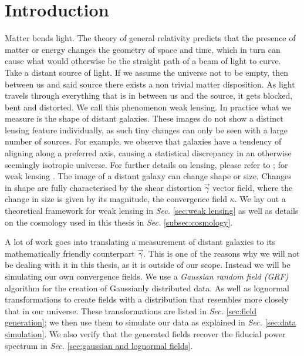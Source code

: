 \chapter{Introduction}

Matter bends light. The theory of general relativity predicts that the presence of matter or energy changes the geometry of space and time, which in turn can cause what would otherwise be the straight path of a beam of light to curve. Take a distant source of light. If we assume the universe not to be empty, then between us and said source there exists a non trivial matter disposition. As light travels through everything that is in between us and the source, it gets blocked, bent and distorted. We call this phenomenon weak lensing. In practice what we measure is the shape of distant galaxies. These images do not show a distinct lensing feature individually, as such tiny changes can only be seen with a large number of sources. For example, we observe that galaxies have a tendency of aligning along a preferred axis, causing a statistical discrepancy in an otherwise seemingly isotropic universe. For further details on lensing, please refer to \cite{cosmology:lensing} \cite{cosmology:lensing2}; for weak lensing \cite{weaklensing}. The image of a distant galaxy can change shape or size. Changes in shape are fully characterised by the shear distortion $\Vec{\gamma}$ vector field, where the change in size is given by its magnitude, the convergence field $\kappa$. We lay out a theoretical framework for weak lensing in \textit{Sec. }\ref{sec:weak lensing} as well as details on the cosmology used in this thesis in \textit{Sec. }\ref{subsec:cosmology}.

A lot of work goes into translating a measurement of distant galaxies to its mathematically friendly counterpart $\Vec{\gamma}$. This is one of the reasons why we will not be dealing with it in this thesis, as it is outside of our scope. Instead we will be simulating our own convergence fields. We use a \textit{Gaussian random field (GRF)} algorithm for the creation of Gaussianly distributed data. As well as lognormal transformations to create fields with a distribution that resembles more closely that in our universe. These transformations are listed in \textit{Sec. }\ref{sec:field generation}; we then use them to simulate our data as explained in \textit{Sec. }\ref{sec:data simulation}. We also verify that the generated fields recover the fiducial power spectrum in \textit{Sec. }\ref{sec:gaussian and lognormal fields}.


